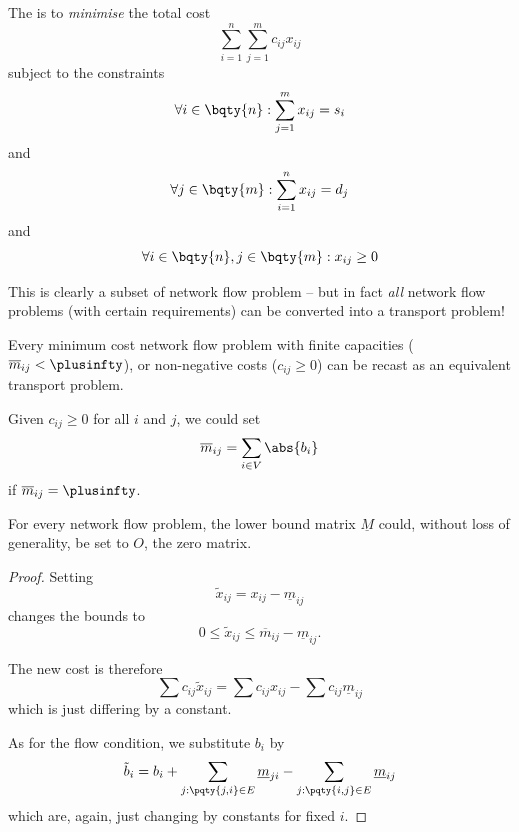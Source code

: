 \begin{definition}
    The  is to \emph{minimise} the total cost
    \[
        \sum_{i = 1}^{n} \sum_{j = 1}^{m} c_{ij} x_{ij}
    \]
    subject to the constraints
    \[
        \forall i \in \bqty{n}: \sum_{j = 1}^{m} x_{ij} = s_i
    \]
    and
    \[
        \forall j \in \bqty{m}: \sum_{i = 1}^{n} x_{ij} = d_j
    \]
    and
    \[
        \forall i \in \bqty{n}, j \in \bqty{m}: x_{ij} \geq 0
    \]  
\end{definition}

This is clearly a subset of network flow problem -- but in fact \emph{all} network flow problems (with certain requirements) can be converted into a transport problem!

\begin{theorem}
    \label{thm:network-flow-recast-transport}%
    Every minimum cost network flow problem with finite capacities (\(\overline{m}_{ij} < \plusinfty\)), or non-negative costs (\(c_{ij} \geq 0\)) can be recast as an equivalent transport problem.
\end{theorem}

\begin{remark}
    Given \(c_{ij} \geq 0\) for all \(i\) and \(j\), we could set
    \[
        \overline{m}_{ij} = \sum_{i \in V} \abs{b_i}
    \]
    if \(\overline{m}_{ij} = \plusinfty\).
\end{remark}

\begin{lemma}
    For every network flow problem, the lower bound matrix \(\underline{M}\) could, without loss of generality, be set to \(O\), the zero matrix.
\end{lemma}

\begin{proof}
    Setting
    \[
        \tilde{x}_{ij} = x_{ij} - \underline{m}_{ij}
    \]
    changes the bounds to
    \[
        0 \leq \tilde{x}_{ij} \leq \overline{m}_{ij} - \underline{m}_{ij}.
    \]

    The new cost is therefore
    \[
        \sum c_{ij} \tilde{x}_{ij} = \sum c_{ij} x_{ij} - \sum c_{ij} \underline{m}_{ij}
    \]
    which is just differing by a constant.

    As for the flow condition, we substitute \(b_i\) by
    \[
        \tilde{b}_i = b_i + \sum_{j: \pqty{j, i} \in E} \underline{m}_{ji} - \sum_{j: \pqty{i, j} \in E} \underline{m}_{ij}
    \]
    which are, again, just changing by constants for fixed \(i\).
\end{proof}

